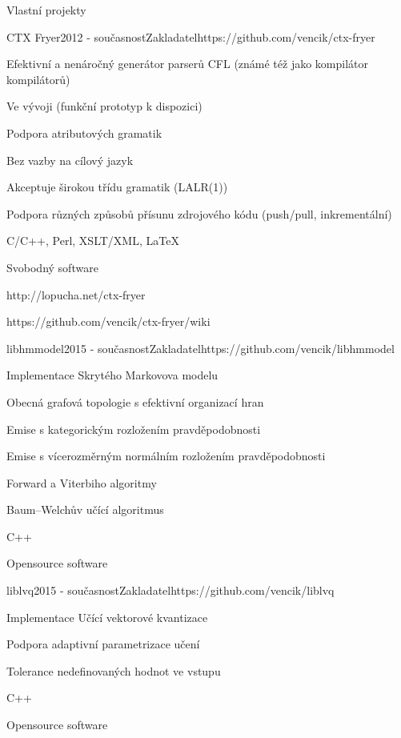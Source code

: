 \documentclass{resume} %
\begin{document}
\begin{rSection}{Vlastn\'{i} projekty}


\begin{rSubsection}{CTX Fryer}{2012 - sou\v{c}asnost}{Zakladatel}{https://github.com/vencik/ctx-fryer}
\item Efektivn\'{i} a nen\'{a}ro\v{c}n\'{y} gener\'{a}tor parser\r{u} CFL (zn\'{a}m\'{e} t\'{e}\v{z} jako kompil\'{a}tor kompil\'{a}tor\r{u})
\item Ve v\'{y}voji (funk\v{c}n\'{i} prototyp k dispozici)
\item Podpora atributov\'{y}ch gramatik
\item Bez vazby na c\'{i}lov\'{y} jazyk
\item Akceptuje \v{s}irokou t\v{r}\'{i}du gramatik (LALR(1))
\item Podpora r\r{u}zn\'{y}ch zp\r{u}sob\r{u} p\v{r}\'{i}sunu zdrojov\'{e}ho k\'{o}du (push/pull, inkrement\'{a}ln\'{i})
\item C/C++, Perl, XSLT/XML, \LaTeX
\item Svobodn\'{y} software
\item http://lopucha.net/ctx-fryer
\item https://github.com/vencik/ctx-fryer/wiki
\end{rSubsection}

\begin{rSubsection}{libhmmodel}{2015 - sou\v{c}asnost}{Zakladatel}{https://github.com/vencik/libhmmodel}
\item Implementace Skryt\'{e}ho Markovova modelu
\item Obecn\'{a} grafov\'{a} topologie s efektivn\'{i} organizac\'{i} hran
\item Emise s kategorick\'{y}m rozlo\v{z}en\'{i}m pravd\v{e}podobnosti
\item Emise s v\'{i}cerozm\v{e}rn\'{y}m norm\'{a}ln\'{i}m rozlo\v{z}en\'{i}m pravd\v{e}podobnosti
\item Forward a Viterbiho algoritmy
\item Baum--Welch\r{u}v u\v{c}\'{i}c\'{i} algoritmus
\item C++
\item Opensource software
\end{rSubsection}

\begin{rSubsection}{liblvq}{2015 - sou\v{c}asnost}{Zakladatel}{https://github.com/vencik/liblvq}
\item Implementace U\v{c}\'{i}c\'{i} vektorov\'{e} kvantizace
\item Podpora adaptivn\'{i} parametrizace u\v{c}en\'{i}
\item Tolerance nedefinovan\'{y}ch hodnot ve vstupu
\item C++
\item Opensource software
\end{rSubsection}


\end{rSection}
\end{document}
